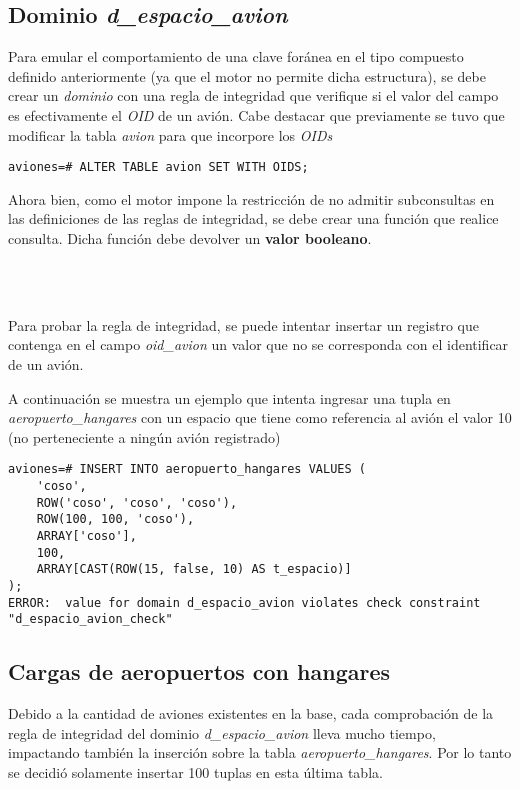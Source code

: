 \subsection{Dominio \emph{d\_espacio\_avion}}

Para emular el comportamiento de una clave foránea en el tipo compuesto definido anteriormente (ya que el motor no permite dicha estructura), se debe crear un \emph{dominio} con una regla de integridad que verifique si el valor del campo es efectivamente el \emph{OID} de un avión. Cabe destacar que previamente se tuvo que modificar la tabla \emph{avion} para que incorpore los \emph{OIDs}  

\vspace*{5mm}
\lstset{style=sql}
\begin{lstlisting}
aviones=# ALTER TABLE avion SET WITH OIDS;
\end{lstlisting}

Ahora bien, como el motor impone la restricción de no admitir subconsultas en las definiciones de las reglas de integridad, se debe crear una función que realice consulta. Dicha función debe devolver un \textbf{valor booleano}. 

\\~

Para probar la regla de integridad, se puede intentar insertar un registro que contenga en el campo \emph{oid\_avion} un valor que no se corresponda con el identificar de un avión. 

A continuación se muestra un ejemplo que intenta ingresar una tupla en \emph{aeropuerto\_hangares} con un espacio que tiene como referencia al avión el valor 10 (no perteneciente a ningún avión registrado)

\vspace*{5mm}
\lstset{style=sql}
\begin{lstlisting}
aviones=# INSERT INTO aeropuerto_hangares VALUES (
    'coso', 
    ROW('coso', 'coso', 'coso'),
    ROW(100, 100, 'coso'),
    ARRAY['coso'],
    100,
    ARRAY[CAST(ROW(15, false, 10) AS t_espacio)]
);
ERROR:  value for domain d_espacio_avion violates check constraint "d_espacio_avion_check"
\end{lstlisting}

\subsection{Cargas de aeropuertos con hangares}

Debido a la cantidad de aviones existentes en la base, cada comprobación de la regla de integridad del dominio \emph{d\_espacio\_avion} lleva mucho tiempo, impactando también la inserción sobre la tabla \emph{aeropuerto\_hangares}. Por lo tanto se decidió solamente insertar 100 tuplas en esta última tabla.

